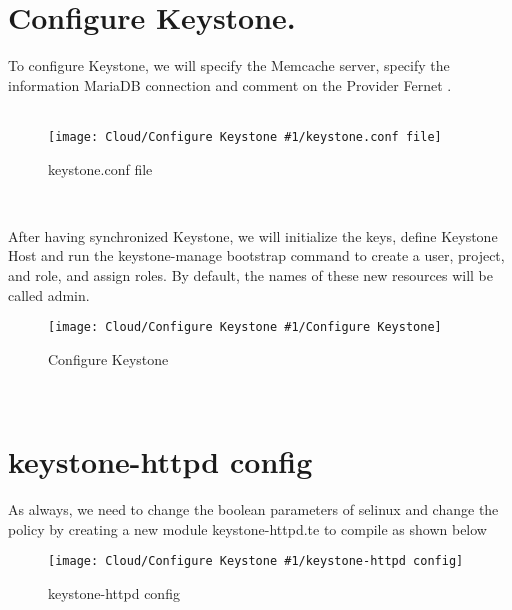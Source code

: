 \begin{spacing}{1.2}
\section{Configure Keystone.}

\par To configure Keystone, we will specify the Memcache server, specify the information
MariaDB connection and comment on the Provider Fernet .\\

\\
\begin{figure}[!htb] 
\begin{center} 
\texttt{[image: Cloud/Configure Keystone \#1/keystone.conf file]} 
\end{center} 
\caption{keystone.conf file} 
\end{figure}  \FloatBarrier
\\
\par After having synchronized Keystone, we will initialize the keys, define Keystone Host and
run the keystone-manage bootstrap command to create a user, project, and role, and
assign roles. By default, the names of these new resources will be called admin. 
\\
\begin{figure}[!htb] 
\begin{center} 
\texttt{[image: Cloud/Configure Keystone \#1/Configure Keystone]} 
\end{center} 
\caption{Configure Keystone} 
\end{figure}  \FloatBarrier
\\
\section{keystone-httpd config}
\par 
As always, we need to change the boolean parameters of selinux and change the policy by creating a new module keystone-httpd.te to compile as shown below
\\
\begin{figure}[!htb] 
\begin{center} 
\texttt{[image: Cloud/Configure Keystone \#1/keystone-httpd config]} 
\end{center} 
\caption{keystone-httpd config} 
\end{figure}  \FloatBarrier
\\

\end{spacing}
